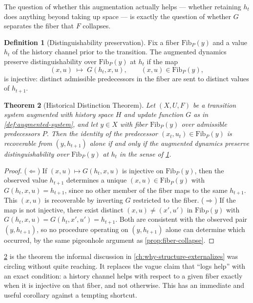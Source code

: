 \documentclass[11pt]{book}
\theoremstyle{plain}
\newtheorem{theorem}{Theorem}[chapter]
\theoremstyle{definition}
\newtheorem{definition}[theorem]{Definition}
\theoremstyle{remark}
\begin{document}
The question of whether this augmentation actually helps --- whether
retaining $h_t$ does anything beyond taking up space --- is exactly
the question of whether $G$ separates the fiber that $F$ collapses.

\begin{definition}[Distinguishability preservation]
\label{def:distinguishability}
Fix a fiber $\mathrm{Fib}_P(y)$ and a value $h_t$ of the history
channel prior to the transition. The augmented dynamics preserve
distinguishability over $\mathrm{Fib}_P(y)$ at $h_t$ if the map
\[
(x, u) \;\longmapsto\; G(h_t, x, u), \qquad (x,u) \in \mathrm{Fib}_P(y),
\]
is injective: distinct admissible predecessors in the fiber are sent
to distinct values of $h_{t+1}$.
\end{definition}

\begin{theorem}[Historical Distinction Theorem]
\label{thm:historical-distinction}
Let $(X, U, F)$ be a transition system augmented with history space
$H$ and update function $G$ as in \cref{def:augmented-system}, and let
$y \in X$ with fiber $\mathrm{Fib}_P(y)$ over admissible predecessors
$P$. Then the identity of the predecessor $(x_t, u_t) \in
\mathrm{Fib}_P(y)$ is recoverable from $(y, h_{t+1})$ alone if and only
if the augmented dynamics preserve distinguishability over
$\mathrm{Fib}_P(y)$ at $h_t$ in the sense of
\cref{def:distinguishability}.
\end{theorem}

\begin{proof}
($\Leftarrow$) If $(x,u) \mapsto G(h_t,x,u)$ is injective on
$\mathrm{Fib}_P(y)$, then the observed value $h_{t+1}$ determines a
unique $(x,u) \in \mathrm{Fib}_P(y)$ with $G(h_t,x,u) = h_{t+1}$, since
no other member of the fiber maps to the same $h_{t+1}$. This $(x,u)$
is recoverable by inverting $G$ restricted to the fiber. ($\Rightarrow$)
If the map is not injective, there exist distinct $(x,u) \neq (x',u')$
in $\mathrm{Fib}_P(y)$ with $G(h_t,x,u) = G(h_t,x',u') = h_{t+1}$. Both
are consistent with the observed pair $(y, h_{t+1})$, so no procedure
operating on $(y, h_{t+1})$ alone can determine which occurred, by the
same pigeonhole argument as \cref{prop:fiber-collapse}.
\end{proof}

\cref{thm:historical-distinction} is the theorem the informal
discussion in \cref{ch:why-structure-externalizes} was circling without
quite reaching. It replaces the vague claim that \enquote{logs help}
with an exact condition: a history channel helps with respect to a
given fiber exactly when it is injective on that fiber, and not
otherwise. This has an immediate and useful corollary against a
tempting shortcut.
\end{document}
